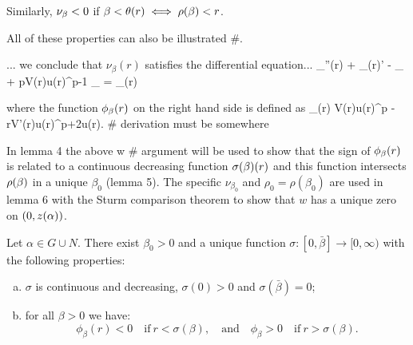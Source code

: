 Similarly, $\nu_{\beta}<0$ if $\beta<\theta(r)\iff\rho(\beta)<r$.  
\endgroup

All of these properties can also be illustrated \#. 

... we conclude that $\nu_{\beta}(r)$ satisfies the differential equation... 
\be \label{nuivp}
    \nu_{\beta}''(r) + \nu_{\beta}(r)' - \lambda\nu_{\beta} + 
    pV(r)u(r)^{p-1} \nu_{\beta} = \phi_{\beta}(r)
\ee

where the function $\phi_{\beta}(r)$ on the right hand side is defined as
\be \label{phibdef}
    \phi_{\beta}(r) \coloneqq {} V(r)u(r)^p - 
    rV'(r)u(r)^p+2\lambda u(r).
\ee
{\red \# derivation must be somewhere}

In lemma 4 the above w \# argument will be used to show that the sign of
$\phi_{\beta}(r)$ is related to a continuous decreasing function $\sigma(\beta)(r)$ and this
function intersects $\rho(\beta)$ in a unique $\beta_0$ (lemma 5). The specific
$\nu_{\beta_0}$ and $\rho_0=\rho(\beta_0)$ are used in lemma 6 with the Sturm
comparison theorem to show that $w$ has a unique zero on $(0,z(\alpha))$.


\begin{lemma}\label{genlem4}
Let $\alpha \in G \cup N$. There exist $\beta_0 > 0$ and a {\red unique} function
$\sigma : [0, \bar\beta] \to [0, \infty)$ with the following properties:
\begin{enumerate}[(a)]
\item  $\sigma$ is continuous and decreasing, $\sigma(0) > 0$ and
$\sigma(\bar\beta) = 0$; 
\item for all $\beta > 0$ we have: 
\[
    \phi_\beta(r) < 0 \quad \text{if} ~ r < \sigma(\beta), 
    \quad \text{and} \quad
    \phi_\beta > 0 \quad \text{if} ~ r > \sigma(\beta). 
\]
\end{enumerate}
\end{lemma}


